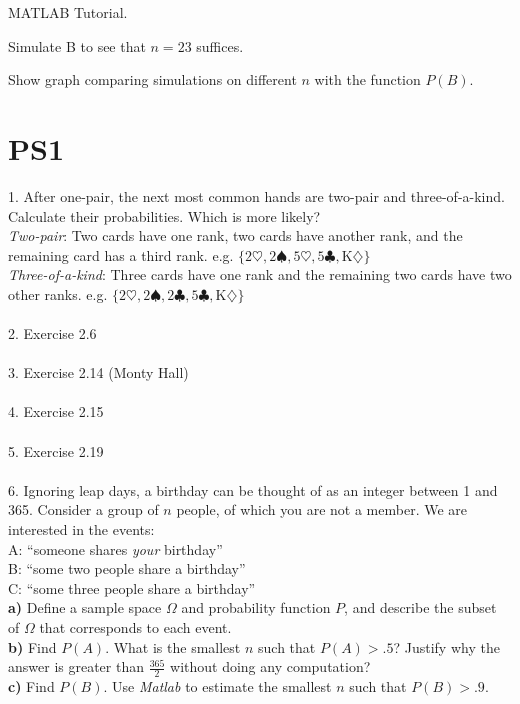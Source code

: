 \documentclass[12pt]{article}
\begin{document}
MATLAB Tutorial.

Simulate B to see that $n=23$ suffices.

Show graph comparing simulations on different $n$ with the function $P(B)$.

\newpage

\section{PS1}

1. After one-pair, the next most common hands are two-pair and three-of-a-kind.  Calculate their probabilities.  Which is more likely? \\
{\em Two-pair}: Two cards have one rank, two cards have another rank, and the remaining card has a third rank. e.g. $\{2 \heartsuit, 2 \spadesuit, 5 \heartsuit, 5 \clubsuit, \text{K} \diamondsuit\}$\\
{\em Three-of-a-kind}: Three cards have one rank and the remaining two cards have two other ranks. e.g. $\{2 \heartsuit, 2 \spadesuit, 2 \clubsuit, 5 \clubsuit, \text{K} \diamondsuit\}$\\ \\
2. Exercise 2.6 \\ \\
3. Exercise 2.14 (Monty Hall) \\ \\
4. Exercise 2.15 \\ \\
5. Exercise 2.19 \\ \\
6. Ignoring leap days, a birthday can be thought of as an integer between 1 and 365.  Consider a group of $n$ people, of which you are not a member.  We are interested in the events: \\
A: ``someone shares {\em your} birthday'' \\
B: ``some two people share a birthday'' \\
C: ``some three people share a birthday'' \\
{\bf a)} Define a sample space $\Omega$ and probability function $P$, and describe the subset of $\Omega$ that corresponds to each event. \\
{\bf b)} Find $P(A)$.  What is the smallest $n$ such that $P(A) > .5$?  Justify why the answer is greater than $\frac{365}{2}$ without doing any computation?\\
{\bf c)} Find $P(B)$.  Use {\em Matlab} to estimate the smallest $n$ such that $P(B) > .9$. \\
\end{document}
